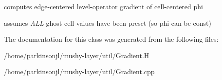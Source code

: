 computes edge-\/centered level-\/operator gradient of cell-\/centered phi 

assumes {\itshape A\-L\-L} ghost cell values have been preset (so phi can be const) 

The documentation for this class was generated from the following files\-:\begin{DoxyCompactItemize}
\item 
/home/parkinsonjl/mushy-\/layer/util/Gradient.\-H\item 
/home/parkinsonjl/mushy-\/layer/util/Gradient.\-cpp\end{DoxyCompactItemize}
